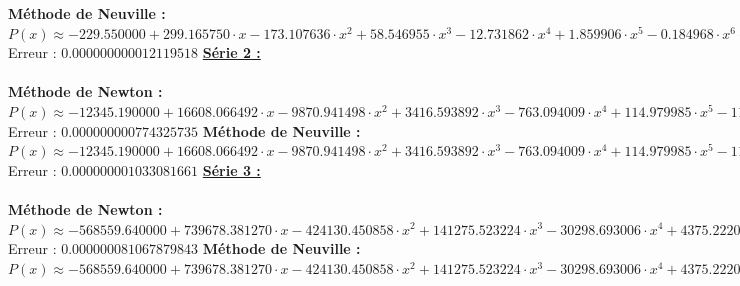 \documentclass{report}
\begin{document}
	\newline
	\textbf{Méthode de Neuville :}\\
	$P(x) \approx -229.550000 + 299.165750 \cdot x- 173.107636 \cdot x^{2}  + 58.546955 \cdot x^{3} - 12.731862 \cdot x^{4}  + 1.859906 \cdot x^{5} - 0.184968 \cdot x^{6}  + 0.012375 \cdot x^{7} - 0.000533 \cdot x^{8}  + 0.000013 \cdot x^{9} - 0.000000 \cdot x^{10} $\\
	Erreur : $0.000000000012119518$
	\newline
	\newline
	\newline
	\underline{\textbf{Série 2 :}} \\ \\
	\textbf{Méthode de Newton :}\\
	$P(x) \approx -12345.190000 + 16608.066492 \cdot x- 9870.941498 \cdot x^{2}  + 3416.593892 \cdot x^{3} - 763.094009 \cdot x^{4}  + 114.979985 \cdot x^{5} - 11.842442 \cdot x^{6}  + 0.823658 \cdot x^{7} - 0.037039 \cdot x^{8}  + 0.000973 \cdot x^{9} - 0.000011 \cdot x^{10} $\\
	Erreur : $0.000000000774325735$
	\newline
	\newline
	\textbf{Méthode de Neuville :}\\
	$P(x) \approx -12345.190000 + 16608.066492 \cdot x- 9870.941498 \cdot x^{2}  + 3416.593892 \cdot x^{3} - 763.094009 \cdot x^{4}  + 114.979985 \cdot x^{5} - 11.842442 \cdot x^{6}  + 0.823658 \cdot x^{7} - 0.037039 \cdot x^{8}  + 0.000973 \cdot x^{9} - 0.000011 \cdot x^{10} $\\
	Erreur : $0.000000001033081661$
	\newline
	\newline
	\newline
	\underline{\textbf{Série 3 :}} \\ \\
	\textbf{Méthode de Newton :}\\
	$P(x) \approx -568559.640000 + 739678.381270 \cdot x- 424130.450858 \cdot x^{2}  + 141275.523224 \cdot x^{3} - 30298.693006 \cdot x^{4}  + 4375.222059 \cdot x^{5} - 431.155992 \cdot x^{6}  + 28.652640 \cdot x^{7} - 1.229803 \cdot x^{8}  + 0.030806 \cdot x^{9} - 0.000342 \cdot x^{10} $\\
	Erreur : $0.000000081067879843$
	\newline
	\newline
	\textbf{Méthode de Neuville :}\\
	$P(x) \approx -568559.640000 + 739678.381270 \cdot x- 424130.450858 \cdot x^{2}  + 141275.523224 \cdot x^{3} - 30298.693006 \cdot x^{4}  + 4375.222059 \cdot x^{5} - 431.155992 \cdot x^{6}  + 28.652640 \cdot x^{7} - 1.229803 \cdot x^{8}  + 0.030806 \cdot x^{9} - 0.000342 \cdot x^{10} $\\
\end{document}
